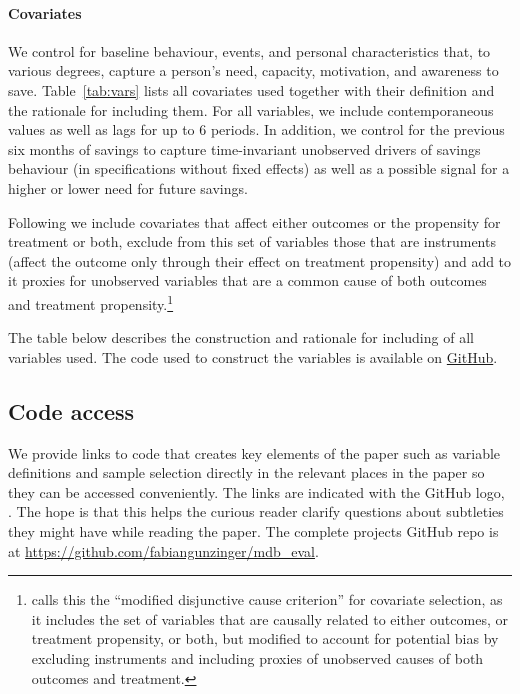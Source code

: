 \paragraph{Covariates}%
\label{par:covariates}

We control for baseline behaviour, events, and personal characteristics that,
to various degrees, capture a person's need, capacity, motivation, and
awareness to save. Table~\ref{tab:vars} lists all covariates used
together with their definition and the rationale for including them. For all
variables, we include contemporaneous values as well as lags for up to 6
periods. In addition, we control for the previous six months of savings to
capture time-invariant unobserved drivers of savings behaviour (in
specifications without fixed effects) as well as a possible signal for a higher
or lower need for future savings.

Following \citet{vanderweele2019principles} we include covariates that affect
either outcomes or the propensity for treatment or both, exclude from this
set of variables those that are instruments (affect the outcome only through their effect on
treatment propensity) and add to it proxies for unobserved variables that are a
common cause of both outcomes and treatment propensity.\footnote{
\citet{vanderweele2019principles} calls this the ``modified disjunctive cause
criterion'' for covariate selection, as it includes the set of variables that are causally
related to either outcomes, or treatment propensity, or both, but modified to
account for potential bias by excluding instruments and including proxies of
unobserved causes of both outcomes and treatment.}

The table below describes the construction and rationale for including of all
variables used. The code used to construct the variables is available on
\href{https://github.com/fabiangunzinger/mdb_eval/blob/d094f8cd364f64bbe3d4e644abbff726af86de2f/src/data/aggregators.py}{GitHub}.




\subsection{Code access}%
\label{sub:code_access}

We provide links to code that creates key elements of the paper such as
variable definitions and sample selection directly in the relevant places in
the paper so they can be accessed conveniently. The links are indicated with
the GitHub logo, \faGithub. The hope is that this helps the
curious reader clarify questions about subtleties they might have while reading
the paper. The complete projects GitHub repo is at
\href{https://github.com/fabiangunzinger/mdb\_eval}{https://github.com/fabiangunzinger/mdb\_eval}.


